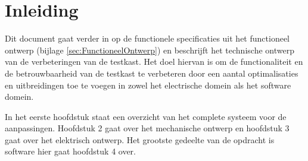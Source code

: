 \section{Inleiding}

Dit document gaat verder in op de functionele specificaties uit het functioneel ontwerp (bijlage \ref{sec:FunctioneelOntwerp}) en beschrijft het technische ontwerp van de verbeteringen van de testkast. Het doel hiervan is om de functionaliteit en de betrouwbaarheid van de testkast te verbeteren door een aantal optimalisaties en uitbreidingen toe te voegen in zowel het electrische domein als het software domein.

\vspace{0.5cm}

In het eerste hoofdstuk staat een overzicht van het complete systeem voor de aanpassingen. Hoofdstuk 2 gaat over het mechanische ontwerp en hoofdstuk 3 gaat over het elektrisch ontwerp. Het grootste gedeelte van de opdracht is software hier gaat hoofdstuk 4 over.